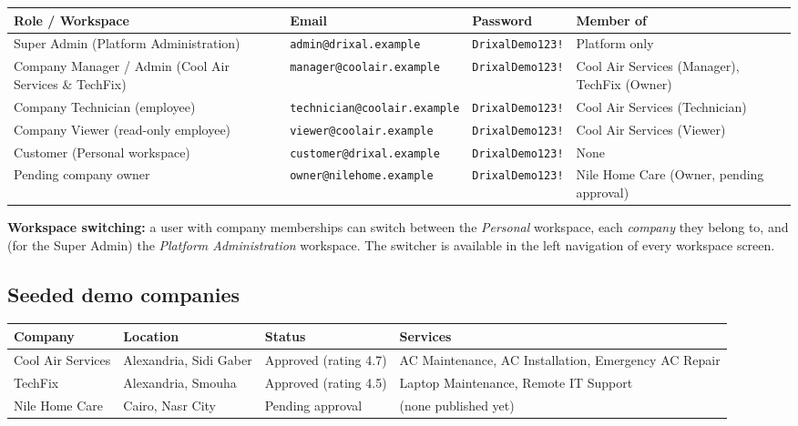 \documentclass[11pt,a4paper]{article}
\begin{document}
\begin{longtable}{@{}L{3.6cm}L{5.2cm}C{2.6cm}L{3.6cm}@{}}
  \toprule
  \textbf{Role / Workspace} & \textbf{Email} & \textbf{Password} & \textbf{Member of} \\
  \midrule
  \endhead
  Super Admin (Platform Administration) & \texttt{admin@drixal.example} & \texttt{DrixalDemo123!} & Platform only \\
  Company Manager / Admin (Cool Air Services \& TechFix) & \texttt{manager@coolair.example} & \texttt{DrixalDemo123!} & Cool Air Services (Manager), TechFix (Owner) \\
  Company Technician (employee) & \texttt{technician@coolair.example} & \texttt{DrixalDemo123!} & Cool Air Services (Technician) \\
  Company Viewer (read-only employee) & \texttt{viewer@coolair.example} & \texttt{DrixalDemo123!} & Cool Air Services (Viewer) \\
  Customer (Personal workspace) & \texttt{customer@drixal.example} & \texttt{DrixalDemo123!} & None \\
  Pending company owner & \texttt{owner@nilehome.example} & \texttt{DrixalDemo123!} & Nile Home Care (Owner, pending approval) \\
  \bottomrule
\end{longtable}

\begin{notebox}
  \textbf{Workspace switching:} a user with company memberships can switch between the \emph{Personal} workspace, each \emph{company} they belong to, and (for the Super Admin) the \emph{Platform Administration} workspace. The switcher is available in the left navigation of every workspace screen.
\end{notebox}

\subsection{Seeded demo companies}
\label{sec:companies}

\begin{longtable}{@{}L{4.4cm}L{4cm}C{2.2cm}L{4.6cm}@{}}
  \toprule
  \textbf{Company} & \textbf{Location} & \textbf{Status} & \textbf{Services} \\
  \midrule
  \endhead
  Cool Air Services & Alexandria, Sidi Gaber & Approved (rating 4.7) & AC Maintenance, AC Installation, Emergency AC Repair \\
  TechFix & Alexandria, Smouha & Approved (rating 4.5) & Laptop Maintenance, Remote IT Support \\
  Nile Home Care & Cairo, Nasr City & Pending approval & (none published yet) \\
  \bottomrule
\end{longtable}
\end{document}
